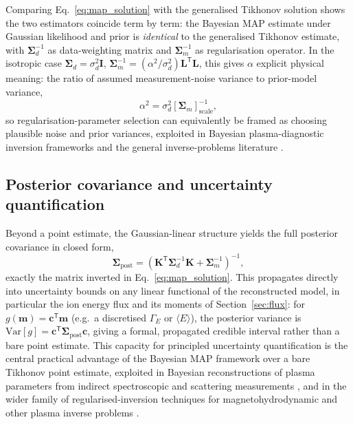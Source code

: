 Comparing Eq.~\eqref{eq:map_solution} with the generalised Tikhonov solution shows the two estimators coincide term by term: the Bayesian MAP estimate under Gaussian likelihood and prior is \emph{identical} to the generalised Tikhonov estimate, with $\boldsymbol{\Sigma}_{d}^{-1}$ as data-weighting matrix and $\boldsymbol{\Sigma}_{m}^{-1}$ as regularisation operator. In the isotropic case $\boldsymbol{\Sigma}_{d} = \sigma_{d}^{2}\mathbf{I}$, $\boldsymbol{\Sigma}_{m}^{-1} = (\alpha^{2}/\sigma_{d}^{2})\mathbf{L}^{\mathsf{T}}\mathbf{L}$, this gives $\alpha$ explicit physical meaning: the ratio of assumed measurement-noise variance to prior-model variance,
\begin{equation}
\alpha^{2} = \sigma_{d}^{2}\left[\boldsymbol{\Sigma}_{m}\right]^{-1}_{\text{scale}},
\end{equation}
so regularisation-parameter selection can equivalently be framed as choosing plausible noise and prior variances, exploited in Bayesian plasma-diagnostic inversion frameworks \cite{ref0683,ref0684,ref0685} and the general inverse-problems literature \cite{ref0687}.

\subsection{Posterior covariance and uncertainty quantification}

Beyond a point estimate, the Gaussian-linear structure yields the full posterior covariance in closed form,
\begin{equation}
\boldsymbol{\Sigma}_{\mathrm{post}} = \left(\mathbf{K}^{\mathsf{T}}\boldsymbol{\Sigma}_{d}^{-1}\mathbf{K} + \boldsymbol{\Sigma}_{m}^{-1}\right)^{-1},
\label{eq:posterior_covariance}
\end{equation}
exactly the matrix inverted in Eq.~\eqref{eq:map_solution}. This propagates directly into uncertainty bounds on any linear functional of the reconstructed model, in particular the ion energy flux and its moments of Section~\ref{sec:flux}: for $g(\mathbf{m}) = \mathbf{c}^{\mathsf{T}}\mathbf{m}$ (e.g.\ a discretised $\Gamma_{E}$ or $\langle E\rangle$), the posterior variance is $\mathrm{Var}[g] = \mathbf{c}^{\mathsf{T}}\boldsymbol{\Sigma}_{\mathrm{post}}\mathbf{c}$, giving a formal, propagated credible interval rather than a bare point estimate. This capacity for principled uncertainty quantification is the central practical advantage of the Bayesian MAP framework over a bare Tikhonov point estimate, exploited in Bayesian reconstructions of plasma parameters from indirect spectroscopic and scattering measurements \cite{ref0683,ref0684,ref0685}, and in the wider family of regularised-inversion techniques for magnetohydrodynamic and other plasma inverse problems \cite{ref0687}.

